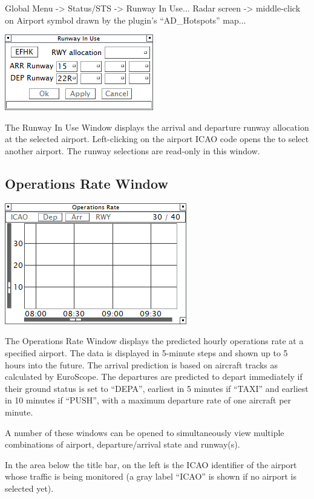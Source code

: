 \documentclass[11pt,a4paper,oldfontcommands]{memoir}
\begin{document}
Global Menu -> Status/STS -> Runway In Use...
Radar screen -> middle-click on Airport symbol drawn by the plugin’s “AD\_Hotspots” map...

\includegraphics{img/rwy.png}

The Runway In Use Window displays the arrival and departure runway allocation at the selected airport. Left-clicking on the airport ICAO code opens the \textit{} to select another airport. The runway selections are read-only in this window.

\subsection{Operations Rate Window}
\label{win:orw}

\includegraphics{img/opsrate.png}

The Operations Rate Window displays the predicted hourly operations rate at a specified airport. The data is displayed in 5-minute steps and shown up to 5 hours into the future. The arrival prediction is based on aircraft tracks as calculated by EuroScope. The departures are predicted to depart immediately if their ground status is set to “DEPA”, earliest in 5 minutes if “TAXI” and earliest in 10 minutes if “PUSH”, with a maximum departure rate of one aircraft per minute.

A number of these windows can be opened to simultaneously view multiple combinations of airport, departure/arrival state and runway(s).

In the area below the title bar, on the left is the ICAO identifier of the airport whose traffic is being monitored (a gray label “ICAO” is shown if no airport is selected yet).
\end{document}
